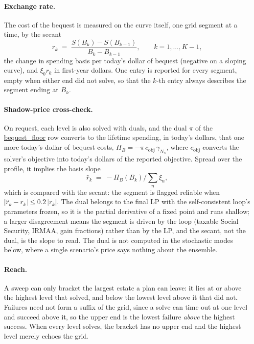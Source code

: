 \documentclass[fleqn,12pt]{report}
\newcommand{\code}[1]{\url{#1}}
\begin{document}
\paragraph*{Exchange rate.}
The cost of the bequest is measured on the curve itself, one grid segment at a time, by the
secant
\begin{equation}
	\label{Eq:FrontierSecant}
	r_k \;=\; \frac{S(B_k) - S(B_{k-1})}{B_k - B_{k-1}},
	\qquad k = 1, \ldots, K-1,
\end{equation}
the change in spending basis per today's dollar of bequest (negative on a sloping curve),
and $\xi_0 r_k$ in first-year dollars.
One entry is reported for every segment, empty when either end did not solve, so that the
$k$-th entry always describes the segment ending at $B_k$.

\paragraph*{Shadow-price cross-check.}
On request, each level is also solved with duals, and the dual $\pi$ of the
\code{bequest_floor} row converts to the lifetime spending, in today's dollars, that one more
today's dollar of bequest costs, $\Pi_B = -\pi\,c_{\mathrm{obj}}\,\gamma_{N_n}$, where
$c_{\mathrm{obj}}$ converts the solver's objective into today's dollars of the reported objective.
Spread over the profile, it implies the basis slope
\begin{equation}
	\label{Eq:FrontierShadow}
	\hat{r}_k \;=\; -\Pi_B(B_k) \Big/ \sum_n \xi_n ,
\end{equation}
which is compared with the secant: the segment is flagged reliable when
$|\hat{r}_k - r_k| \le 0.2\,|r_k|$.
The dual belongs to the final LP with the self-consistent loop's parameters frozen, so it is the
partial derivative of a fixed point and runs shallow; a larger disagreement means the segment is
driven by the loop (taxable Social Security, IRMAA, gain fractions) rather than by the LP, and the
secant, not the dual, is the slope to read.
The dual is not computed in the stochastic modes below, where a single scenario's price says
nothing about the ensemble.

\paragraph*{Reach.}
A sweep can only bracket the largest estate a plan can leave: it lies at or above the highest
level that solved, and below the lowest level above it that did not.
Failures need not form a suffix of the grid, since a solve can time out at one level and succeed
above it, so the upper end is the lowest failure \emph{above} the highest success.
When every level solves, the bracket has no upper end and the highest level merely echoes the grid.
\end{document}
